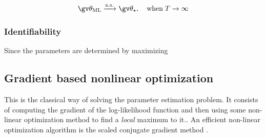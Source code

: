 \begin{description}
\addtolength{\leftskip}{1cm}
\item[Strong consistency]
\begin{align}
	\Th_{\text{ML}} \xrightarrow{\mathrm{a.s.}} \Th_\star,\quad \mathrm{when}\;T\to\infty
\end{align}
\item[Asymptotic normality]

\end{description}


\subsubsection{Identifiability}

Since the parameters are determined by maximizing 

\parencite{Haykin2001,Cappe2005}

\subsection{Gradient based nonlinear optimization}\label{sec:grad}%

This is the classical way of solving the parameter estimation problem. It consists
of computing the gradient of the log-likelihood function and then using some
non-linear optimization method to find a \emph{local} maximum to it.\parencite{Mbalawataa}. 
An efficient non-linear optimization algorithm is the scaled 
conjugate gradient method \parencite{Mbalawataa}.

